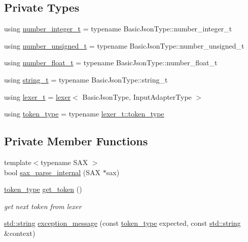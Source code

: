 \subsection*{Private Types}
\begin{DoxyCompactItemize}
\item 
using \hyperlink{classnlohmann_1_1detail_1_1parser_ab70e418cdc4271afd487a7d7704766c5}{number\+\_\+integer\+\_\+t} = typename Basic\+Json\+Type\+::number\+\_\+integer\+\_\+t
\item 
using \hyperlink{classnlohmann_1_1detail_1_1parser_a5590596704edc4a1a983e26f6f3211ff}{number\+\_\+unsigned\+\_\+t} = typename Basic\+Json\+Type\+::number\+\_\+unsigned\+\_\+t
\item 
using \hyperlink{classnlohmann_1_1detail_1_1parser_aaf0c8640d0360fca5334314f0a7e9bad}{number\+\_\+float\+\_\+t} = typename Basic\+Json\+Type\+::number\+\_\+float\+\_\+t
\item 
using \hyperlink{classnlohmann_1_1detail_1_1parser_a4c46f613c87af09f56679253dce768e4}{string\+\_\+t} = typename Basic\+Json\+Type\+::string\+\_\+t
\item 
using \hyperlink{classnlohmann_1_1detail_1_1parser_a5fbd320c5b713fda15d467e8455e4298}{lexer\+\_\+t} = \hyperlink{classnlohmann_1_1detail_1_1lexer}{lexer}$<$ Basic\+Json\+Type, Input\+Adapter\+Type $>$
\item 
using \hyperlink{classnlohmann_1_1detail_1_1parser_a5cb5ea47f09f116e71a908c556325710}{token\+\_\+type} = typename \hyperlink{classnlohmann_1_1detail_1_1lexer_a986907dff5ceb4fa06aa8ff301822726}{lexer\+\_\+t\+::token\+\_\+type}
\end{DoxyCompactItemize}
\subsection*{Private Member Functions}
\begin{DoxyCompactItemize}
\item 
{\footnotesize template$<$typename S\+AX $>$ }\\bool \hyperlink{classnlohmann_1_1detail_1_1parser_a678fdebccc8ddd3242c67b6bce2f8f1a}{sax\+\_\+parse\+\_\+internal} (S\+AX $\ast$sax)
\item 
\hyperlink{classnlohmann_1_1detail_1_1parser_a5cb5ea47f09f116e71a908c556325710}{token\+\_\+type} \hyperlink{classnlohmann_1_1detail_1_1parser_a1212088ee1e23633a76b2ed80514de79}{get\+\_\+token} ()
\begin{DoxyCompactList}\small\item\em get next token from lexer \end{DoxyCompactList}\item 
\hyperlink{namespacenlohmann_1_1detail_a1ed8fc6239da25abcaf681d30ace4985ab45cffe084dd3d20d928bee85e7b0f21}{std\+::string} \hyperlink{classnlohmann_1_1detail_1_1parser_a94e7f8a0f880c20c8a48f591f56cbd85}{exception\+\_\+message} (const \hyperlink{classnlohmann_1_1detail_1_1parser_a5cb5ea47f09f116e71a908c556325710}{token\+\_\+type} expected, const \hyperlink{namespacenlohmann_1_1detail_a1ed8fc6239da25abcaf681d30ace4985ab45cffe084dd3d20d928bee85e7b0f21}{std\+::string} \&context)
\end{DoxyCompactItemize}
